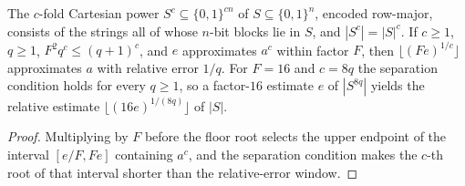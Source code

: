 \begin{lemma}
  \label{lem:randomness-power-boost}
  \leanok
  The $c$-fold Cartesian power $S^c \subseteq \{0,1\}^{cn}$ of
  $S \subseteq \{0,1\}^n$, encoded row-major, consists of the strings all of
  whose $n$-bit blocks lie in $S$, and $|S^c| = |S|^c$. If $c \ge 1$,
  $q \ge 1$, $F^2 q^c \le (q + 1)^c$, and $e$ approximates $a^c$ within factor
  $F$, then $\lfloor (Fe)^{1/c} \rfloor$ approximates $a$ with relative error
  $1/q$. For $F = 16$ and $c = 8q$ the separation condition holds for every
  $q \ge 1$, so a factor-$16$ estimate $e$ of $|S^{8q}|$ yields the relative
  estimate $\lfloor (16e)^{1/(8q)} \rfloor$ of $|S|$.
\end{lemma}
\begin{proof}
  \leanok
  Multiplying by $F$ before the floor root selects the upper endpoint of the
  interval $[e/F, Fe]$ containing $a^c$, and the separation condition makes
  the $c$-th root of that interval shorter than the relative-error window.
\end{proof}

